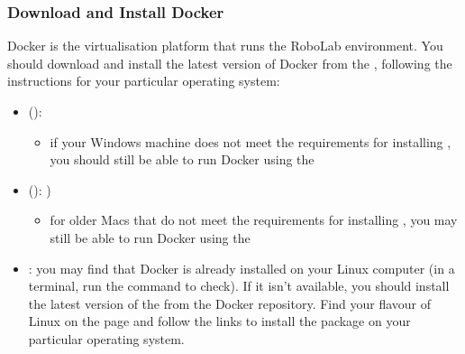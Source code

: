 \documentclass[letterpaper,10pt,english]{sphinxmanual}
\begin{document}
\subsubsection{Download and Install Docker}
\label{\detokenize{content/00_READ_ME_FIRST/Section_00_05_Accessing_RoboLab:Download-and-Install-Docker}}
Docker is the virtualisation platform that runs the RoboLab environment. You should download and install the latest version of Docker from the , following the instructions for your particular operating system:
\begin{itemize}
\item {} 
 (): 
\begin{itemize}
\item {} 
if your Windows machine does not meet the requirements for installing , you should still be able to run Docker using the 

\end{itemize}

\item {} 
 (): )
\begin{itemize}
\item {} 
for older Macs that do not meet the requirements for installing , you may still be able to run Docker using the 

\end{itemize}

\item {} 
: you may find that Docker is already installed on your Linux computer (in a terminal, run the command  to check). If it isn’t available, you should install the latest version of the  from the Docker repository. Find your flavour of Linux on the  page and follow the links to install the package on your particular operating system.

\end{itemize}
\end{document}
